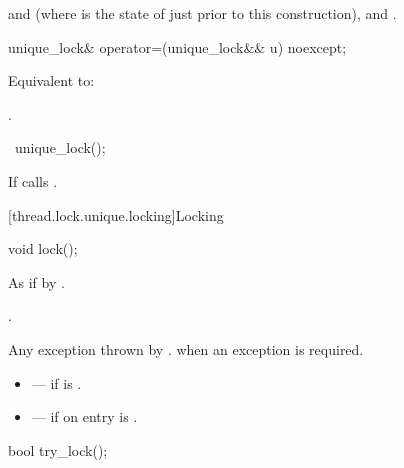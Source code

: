 \begin{itemdescr}
\pnum
\ensures
{} and  (where  is the state of  just prior to this construction),   and .
\end{itemdescr}

%
\begin{itemdecl}
unique_lock& operator=(unique_lock&& u) noexcept;
\end{itemdecl}

\begin{itemdescr}
\pnum
\effects
Equivalent to: 

\pnum
\returns
{}.
\end{itemdescr}

%
\begin{itemdecl}
~unique_lock();
\end{itemdecl}

\begin{itemdescr}
\pnum
\effects
If  calls .
\end{itemdescr}

[thread.lock.unique.locking]{Locking}

%
\begin{itemdecl}
void lock();
\end{itemdecl}

\begin{itemdescr}
\pnum
\effects
As if by .

\pnum
\ensures
{}.

\pnum
\throws
Any exception thrown by .  when an exception
is required.

\pnum
\errors
\begin{itemize}
\item {} --- if  is .
\item {} --- if on entry 
is .
\end{itemize}
\end{itemdescr}

%
\begin{itemdecl}
bool try_lock();
\end{itemdecl}

